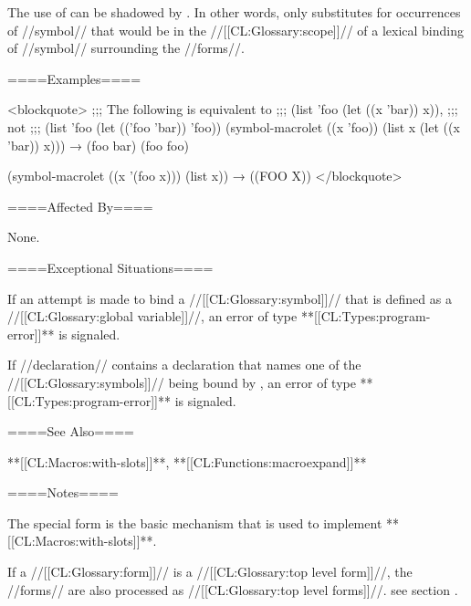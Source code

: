 The use of  can be shadowed by . In other words,  only substitutes for occurrences of //symbol// that would be in the //[[CL:Glossary:scope]]// of a lexical binding of //symbol// surrounding the //forms//.

====Examples====

<blockquote> ;;; The following is equivalent to ;;; (list 'foo (let ((x 'bar)) x)), ;;; not ;;; (list 'foo (let (('foo 'bar)) 'foo)) (symbol-macrolet ((x 'foo)) (list x (let ((x 'bar)) x))) → (foo bar) \NV (foo foo)

(symbol-macrolet ((x '(foo x))) (list x)) → ((FOO X)) </blockquote>

====Affected By====

None.

====Exceptional Situations====

If an attempt is made to bind a //[[CL:Glossary:symbol]]// that is defined as a //[[CL:Glossary:global variable]]//, an error of type **[[CL:Types:program-error]]** is signaled.



If //declaration// contains a  declaration that names one of the //[[CL:Glossary:symbols]]// being bound by , an error of type **[[CL:Types:program-error]]** is signaled.

====See Also====

**[[CL:Macros:with-slots]]**, **[[CL:Functions:macroexpand]]**

====Notes====

The special form  is the basic mechanism that is used to implement **[[CL:Macros:with-slots]]**.

If a  //[[CL:Glossary:form]]// is a //[[CL:Glossary:top level form]]//, the //forms// are also processed as //[[CL:Glossary:top level forms]]//. see section {\secref\FileCompilation}.



      
